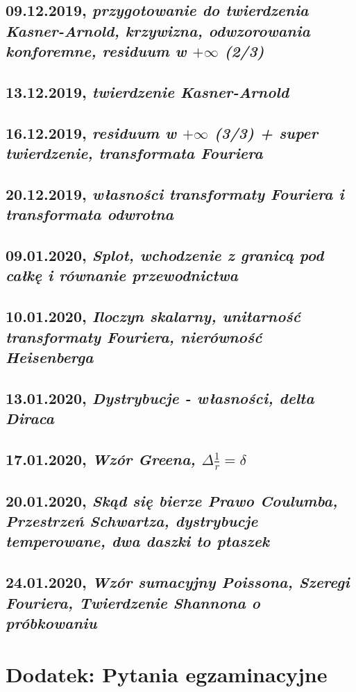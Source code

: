\documentclass[a5paper, oneside]{memoir}
\begin{document}
\chapter{09.12.2019, \textit{przygotowanie do twierdzenia Kasner-Arnold, krzywizna, odwzorowania konforemne, residuum w $+\infty$ (2/3)}}

\chapter{13.12.2019, \textit{twierdzenie Kasner-Arnold}}

\chapter{16.12.2019, \textit{residuum w $+\infty$ (3/3) + super twierdzenie, transformata Fouriera}}

\chapter{20.12.2019, \textit{własności transformaty Fouriera i transformata odwrotna}}

\chapter{09.01.2020, \textit{Splot, wchodzenie z granicą pod całkę i równanie przewodnictwa}}

\chapter{10.01.2020, \textit{Iloczyn skalarny, unitarność transformaty Fouriera, nierówność Heisenberga}}

\chapter{13.01.2020, \textit{Dystrybucje - własności, delta Diraca}}

\chapter{17.01.2020, \textit{Wzór Greena, $\Delta \frac{1}{r} = \delta$ }}

\chapter{20.01.2020, \textit{Skąd się bierze Prawo Coulumba, Przestrzeń Schwartza, dystrybucje temperowane, dwa daszki to ptaszek}}

\chapter{24.01.2020, \textit{Wzór sumacyjny Poissona, Szeregi Fouriera, Twierdzenie Shannona o próbkowaniu}}


\part{\textbf{Dodatek:} Pytania egzaminacyjne}

\end{document}
